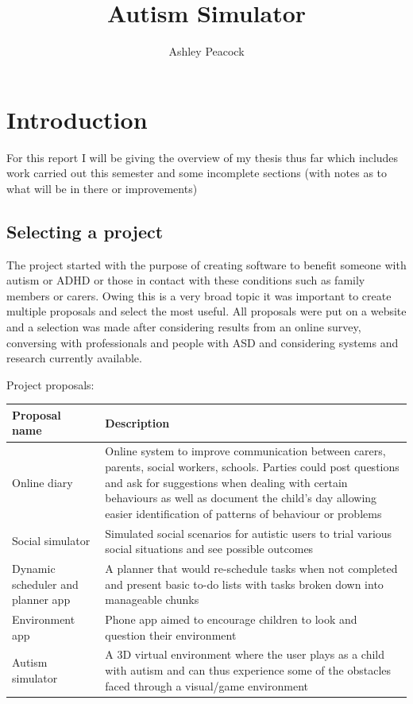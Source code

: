\documentclass[11pt]{report}
\begin{document}
\title{Autism Simulator}
\author{Ashley Peacock}
\maketitle
\tableofcontents


\chapter{Introduction}
For this report I will be giving the overview of my thesis thus far which includes work carried out this semester and some incomplete sections (with notes as to what will be in there or improvements)

\section{Selecting a project}
The project started with the purpose of creating software to benefit someone with autism or ADHD or those in contact with these conditions such as family members or carers. Owing this is a very broad topic it was important to create multiple proposals and select the most useful. All proposals were put on a website and a selection was made after considering results from an online survey, conversing with professionals and people with ASD and considering systems and research currently available.

Project proposals:
\begin{table}[H]
    \begin{tabular}{| p{4cm} | p{9cm} |}
    \hline
    Proposal name & Description                                                                  \\
    \hline
    \hline
    Online diary & Online system to improve communication between carers, parents, social workers, schools. Parties could post questions and ask for suggestions when dealing with certain behaviours as well as document the child's day allowing easier identification of patterns of behaviour or problems                    \\
    \hline
    Social simulator & Simulated social scenarios for autistic users to trial various social situations and see possible outcomes  \\
    \hline
    Dynamic scheduler and planner app & A planner that would re-schedule tasks when not completed and present basic to-do lists with tasks broken down into manageable chunks  \\
    \hline
    Environment app & Phone app aimed to encourage children to look and question their environment \\
    \hline
   Autism simulator & A 3D virtual environment where the user plays as a child with autism and can thus experience some of the obstacles faced through a visual/game environment \\
    \hline
    \end{tabular}
\end{table}
\end{document}
